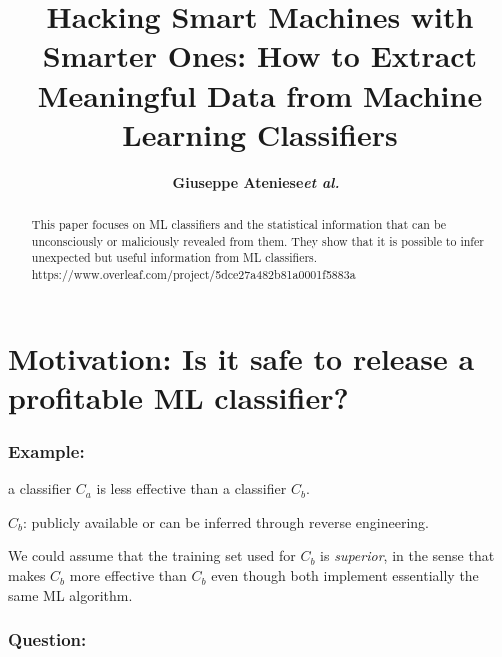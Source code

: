 \documentclass[11pt]{article}
\numberwithin{equation}{section}
\newcommand{\etal}{{\em et al.}\ }
\begin{document}


\title{Hacking Smart Machines with Smarter Ones: How to Extract Meaningful Data from Machine Learning Classifiers}

\author{\textbf{Giuseppe Ateniese\etal}}


\maketitle

\begin{abstract}
This paper focuses on ML classifiers and the statistical information that can be unconsciously or maliciously revealed from them. They show that it is possible to infer unexpected but useful information from ML classifiers.
https://www.overleaf.com/project/5dce27a482b81a0001f5883a
\end{abstract}

\section{Motivation: Is it safe to release a profitable ML classifier?} 

\subsubsection*{Example: }a classifier $C_a$ is less effective than a classifier $C_b$.

$C_b$: publicly available or can be inferred through reverse engineering. 

We could assume that the training set used for $C_b$ is \textit{superior}, in the sense that makes $C_b$ more effective than $C_b$ even though both implement essentially the same ML algorithm.

\subsubsection*{Question:}~
\end{document}
